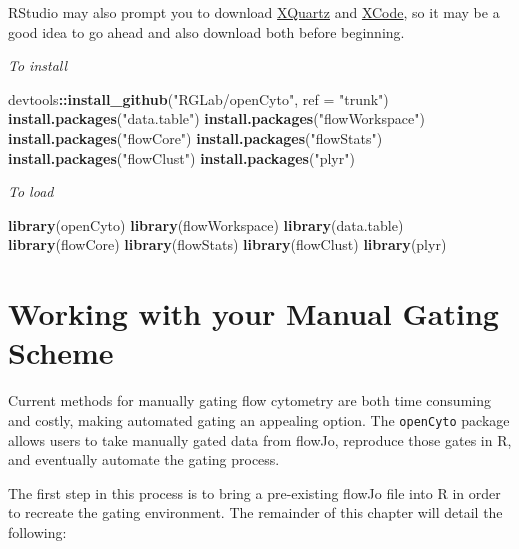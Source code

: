 \documentclass[]{book}
\newenvironment{Shaded}{\begin{snugshade}}{\end{snugshade}}
\newcommand{\DataTypeTok}[1]{\textcolor[rgb]{0.13,0.29,0.53}{#1}}
\newcommand{\KeywordTok}[1]{\textcolor[rgb]{0.13,0.29,0.53}{\textbf{#1}}}
\newcommand{\NormalTok}[1]{#1}
\newcommand{\OperatorTok}[1]{\textcolor[rgb]{0.81,0.36,0.00}{\textbf{#1}}}
\newcommand{\StringTok}[1]{\textcolor[rgb]{0.31,0.60,0.02}{#1}}
\begin{document}
RStudio may also prompt you to download \href{https://www.xquartz.org/}{XQuartz} and \href{https://developer.apple.com/xcode/}{XCode}, so it may be a good idea to go ahead and also download both before beginning.

\emph{To install}

\begin{Shaded}
\begin{Highlighting}[]
\NormalTok{devtools}\OperatorTok{::}\KeywordTok{install_github}\NormalTok{(}\StringTok{"RGLab/openCyto"}\NormalTok{, }\DataTypeTok{ref =} \StringTok{"trunk"}\NormalTok{)}
\KeywordTok{install.packages}\NormalTok{(}\StringTok{"data.table"}\NormalTok{)}
\KeywordTok{install.packages}\NormalTok{(}\StringTok{"flowWorkspace"}\NormalTok{)}
\KeywordTok{install.packages}\NormalTok{(}\StringTok{"flowCore"}\NormalTok{)}
\KeywordTok{install.packages}\NormalTok{(}\StringTok{"flowStats"}\NormalTok{)}
\KeywordTok{install.packages}\NormalTok{(}\StringTok{"flowClust"}\NormalTok{)}
\KeywordTok{install.packages}\NormalTok{(}\StringTok{"plyr"}\NormalTok{)}
\end{Highlighting}
\end{Shaded}

\emph{To load}

\begin{Shaded}
\begin{Highlighting}[]
\KeywordTok{library}\NormalTok{(openCyto)}
\KeywordTok{library}\NormalTok{(flowWorkspace)}
\KeywordTok{library}\NormalTok{(data.table)}
\KeywordTok{library}\NormalTok{(flowCore)}
\KeywordTok{library}\NormalTok{(flowStats)}
\KeywordTok{library}\NormalTok{(flowClust)}
\KeywordTok{library}\NormalTok{(plyr)}
\end{Highlighting}
\end{Shaded}

\hypertarget{working-with-your-manual-gating-scheme}{%
\chapter{Working with your Manual Gating Scheme}\label{working-with-your-manual-gating-scheme}}

Current methods for manually gating flow cytometry are both time consuming and costly, making automated gating an appealing option. The \texttt{openCyto} package allows users to take manually gated data from flowJo, reproduce those gates in R, and eventually automate the gating process.

The first step in this process is to bring a pre-existing flowJo file into R in order to recreate the gating environment. The remainder of this chapter will detail the following:
\end{document}
